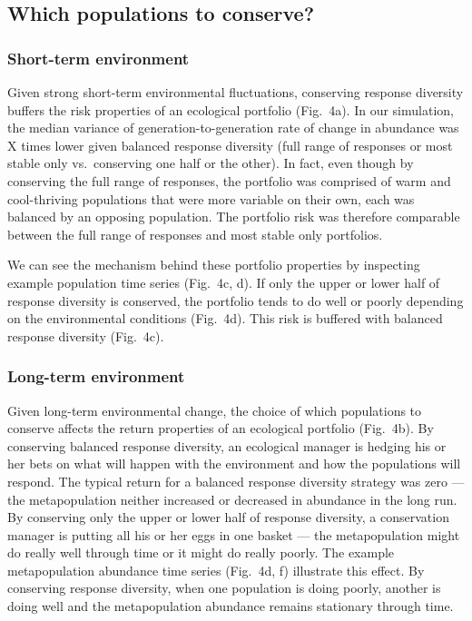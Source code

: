 \subsection{Which populations to conserve?}

\subsubsection{Short-term environment}

Given strong short-term environmental fluctuations, conserving response diversity buffers the risk properties of an ecological portfolio (Fig.~4a). In our simulation, the median variance of generation-to-generation rate of change in abundance was X times lower given balanced response diversity (full range of responses or most stable only vs.~conserving one half or the other). In fact, even though by conserving the full range of responses, the portfolio was comprised of warm and cool-thriving populations that were more variable on their own, each was balanced by an opposing population. The portfolio risk was therefore comparable between the full range of responses and most stable only portfolios.

We can see the mechanism behind these portfolio properties by inspecting example population time series (Fig.~4c, d). If only the upper or lower half of response diversity is conserved, the portfolio tends to do well or poorly depending on the environmental conditions (Fig.~4d). This risk is buffered with balanced response diversity (Fig.~4c).

\subsubsection{Long-term environment}

Given long-term environmental change, the choice of which populations to conserve affects the return properties of an ecological portfolio (Fig.~4b). By conserving balanced response diversity, an ecological manager is hedging his or her bets on what will happen with the environment and how the populations will respond. The typical return for a balanced response diversity strategy was zero --- the metapopulation neither increased or decreased in abundance in the long run. By conserving only the upper or lower half of response diversity, a conservation manager is putting all his or her eggs in one basket --- the metapopulation might do really well through time or it might do really poorly. The example metapopulation abundance time series (Fig.~4d, f) illustrate this effect. By conserving response diversity, when one population is doing poorly, another is doing well and the metapopulation abundance remains stationary through time.

